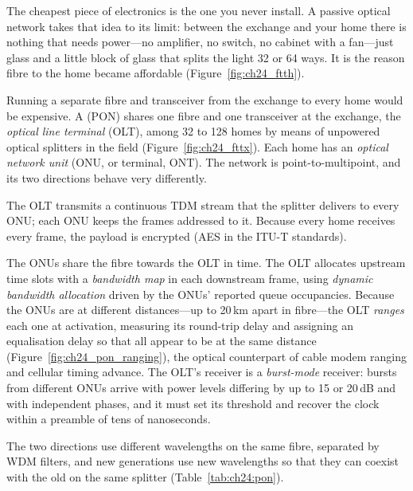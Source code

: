 The cheapest piece of electronics is the one you never install. A passive optical network takes that
idea to its limit: between the exchange and your home there is nothing that needs power---no amplifier,
no switch, no cabinet with a fan---just glass and a little block of glass that splits the light 32 or 64
ways. It is the reason fibre to the home became affordable (Figure~\ref{fig:ch24_ftth}).

Running a separate fibre and transceiver from the exchange to every home would be expensive. A
 (PON) shares one fibre and one transceiver at the exchange, the
\emph{optical line terminal} (OLT), among 32 to 128 homes by means of unpowered optical splitters in the
field (Figure~\ref{fig:ch24_fttx}). Each home has an \emph{optical network unit} (ONU, or terminal, ONT).
The network is point-to-multipoint, and its two directions behave very differently.
\begin{description}[style=nextline,leftmargin=1.2em,font=\sffamily\bfseries\small\color{navy}]
\item[Downstream: broadcast.] The OLT transmits a continuous TDM stream that the splitter delivers to every
ONU; each ONU keeps the frames addressed to it. Because every home receives every frame, the payload is
encrypted (AES in the ITU-T standards).
\item[Upstream: TDMA.] The ONUs share the fibre towards the OLT in time. The OLT allocates upstream time slots
with a \emph{bandwidth map} in each downstream frame, using \emph{dynamic bandwidth allocation} driven by the
ONUs' reported queue occupancies. Because the ONUs are at different distances---up to 20\,km apart in
fibre---the OLT \emph{ranges} each one at activation, measuring its round-trip delay and assigning an
equalisation delay so that all appear to be at the same distance (Figure~\ref{fig:ch24_pon_ranging}), the
optical counterpart of cable modem ranging and cellular timing advance. The OLT's receiver is a
\emph{burst-mode} receiver: bursts from different ONUs arrive with power levels differing by up to 15 or
20\,dB and with independent phases, and it must set its threshold and recover the clock within a preamble
of tens of nanoseconds.
\end{description}
The two directions use different wavelengths on the same fibre, separated by WDM filters, and new
generations use new wavelengths so that they can coexist with the old on the same splitter
(Table~\ref{tab:ch24:pon}).


